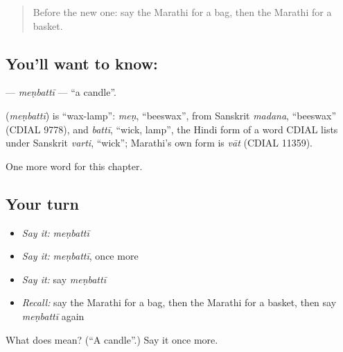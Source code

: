 \label{lesson:MR-C133-menbatti}



\begin{quote}
Before the new one: say the Marathi for a bag, then the Marathi for a basket.
\end{quote}

\subsection*{You'll want to know: }
\textbf{} — \emph{meṇbattī} — \textquotedblleft{}a candle\textquotedblright{}.

\begin{cousinweb}
\textbf{} (\emph{meṇbattī}) is \textquotedblleft{}wax-lamp\textquotedblright{}: \emph{meṇ}, \textquotedblleft{}beeswax\textquotedblright{}, from Sanskrit \emph{madana}, \textquotedblleft{}beeswax\textquotedblright{} (CDIAL 9778), and \emph{battī}, \textquotedblleft{}wick, lamp\textquotedblright{}, the Hindi form of a word CDIAL lists under Sanskrit \emph{varti}, \textquotedblleft{}wick\textquotedblright{}; Marathi's own form is \emph{vāt} (CDIAL 11359).
\end{cousinweb}

\begin{grammarlens}[title={What you've built}]
One more word for this chapter.
\end{grammarlens}

\subsection*{Your turn}
\begin{itemize}
\raggedright
  \item \emph{Say it:} \emph{meṇbattī}
  \item \emph{Say it:} \emph{meṇbattī}, once more
  \item \emph{Say it:} say \emph{meṇbattī}
  \item \emph{Recall:} say the Marathi for a bag, then the Marathi for a basket, then say \emph{meṇbattī} again
\end{itemize}

\begin{tcolorbox}[breakable,colback=teal!4,colframe=teal!35!black,title={Before you move on}]
What does  mean? (\textquotedblleft{}A candle\textquotedblright{}.) Say it once more.
\end{tcolorbox}
